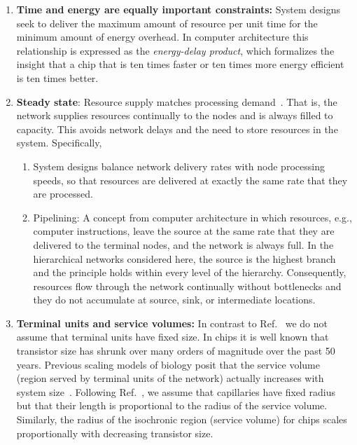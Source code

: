 \documentclass[12pt]{article}
\begin{document}
\begin{enumerate}
\item {\bf Time and energy are equally important constraints:} 
  System designs seek to deliver the maximum amount of
  resource per unit time for the minimum amount of energy overhead. 
  In computer architecture this relationship is expressed as the
  \emph{energy-delay product}, which formalizes the insight that a
  chip that is ten times faster or ten times more energy efficient is
  ten times better. 

\item {\bf Steady state}: Resource supply matches processing
  demand~\cite{banavar10}.  That is, the network supplies resources continually
  to the nodes and is always filled to capacity.  This avoids network
  delays and the need to store resources in the system. Specifically,

  \begin{enumerate}

\item System designs balance network delivery rates with node processing
  speeds, so that resources are delivered at exactly the same rate that they
  are processed.

\item Pipelining: A concept from computer architecture in which resources,
  e.g., computer instructions, leave the source at the same rate that they are
  delivered to the terminal nodes, and the network is always full.  In the
  hierarchical networks considered here, the source is the highest branch
  and the principle holds within every level of the hierarchy.
  Consequently, resources flow through the network continually 
  without bottlenecks and they do not accumulate at source, sink, or intermediate locations.
  \end{enumerate}

\item {\bf Terminal units and service volumes:} In contrast to
  Ref.~\cite{west97} we do not assume that terminal units have fixed size.   In
  chips it is well known that transistor size has shrunk over many orders of
  magnitude over the past 50 years.   Previous scaling models of biology posit that the service volume
  (region served by terminal units of the network) actually increases with
  system size~\cite{west97,banavar10}.  Following Ref.~\cite{banavar10}, we
  assume that capillaries have fixed radius but that their length is
  proportional to the radius of the service volume.   Similarly, the radius of
  the isochronic region (service volume) for chips scales proportionally with
  decreasing transistor size.
\end{enumerate}
\end{document}
